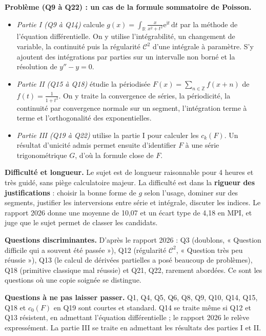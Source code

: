 \documentclass[11pt,a4paper]{article}
\providecommand{\tightlist}{\setlength{\itemsep}{0pt}\setlength{\parskip}{0pt}}
\begin{document}
\textbf{Problème (Q9 à Q22) : un cas de la formule sommatoire de Poisson.}

\begin{itemize}
\tightlist
\item
  \emph{Partie I (Q9 à Q14)} calcule \(g(x)=\int_{\mathbb{R}}\frac{x}{x^2+t^2}{\mathrm{e}}^{\mathrm{i}t}\,\mathrm{d}t\) par la méthode de l'équation différentielle. On y utilise l'intégrabilité, un changement de variable, la continuité puis la régularité \({\mathcal{C}}^2\) d'une intégrale à paramètre. S'y ajoutent des intégrations par parties sur un intervalle non borné et la résolution de \(y''-y=0\).
\item
  \emph{Partie II (Q15 à Q18)} étudie la périodisée \(F(x)=\sum_{n\in\mathbb{Z}}f(x+n)\) de \(f(t)=\frac{1}{1+t^2}\). On y traite la convergence de séries, la périodicité, la continuité par convergence normale sur un segment, l'intégration terme à terme et l'orthogonalité des exponentielles.
\item
  \emph{Partie III (Q19 à Q22)} utilise la partie I pour calculer les \(c_k(F)\). Un résultat d'unicité admis permet ensuite d'identifier \(F\) à une série trigonométrique \(G\), d'où la formule close de \(F\).
\end{itemize}

\textbf{Difficulté et longueur.} Le sujet est de longueur raisonnable pour 4 heures et très guidé, sans piège calculatoire majeur. La difficulté est dans la \textbf{rigueur des justifications} : choisir la bonne forme de \(g\) selon l'usage, dominer sur des segments, justifier les interversions entre série et intégrale, discuter les indices. Le rapport 2026 donne une moyenne de 10,07 et un écart type de 4,18 en MPI, et juge que le sujet permet de classer les candidats.

\textbf{Questions discriminantes.} D'après le rapport 2026 : Q3 (doublons, « Question difficile qui a souvent été passée »), Q12 (régularité \({\mathcal{C}}^2\), « Question très peu réussie »), Q13 (le calcul de dérivées partielles a posé beaucoup de problèmes), Q18 (primitive classique mal réussie) et Q21, Q22, rarement abordées. Ce sont les questions où une copie soignée se distingue.

\textbf{Questions à ne pas laisser passer.} Q1, Q4, Q5, Q6, Q8, Q9, Q10, Q14, Q15, Q18 et \(c_0(F)\) en Q19 sont courtes et standard. Q14 se traite même si Q12 et Q13 résistent, en admettant l'équation différentielle ; le rapport 2026 le relève expressément. La partie III se traite en admettant les résultats des parties I et II.
\end{document}
